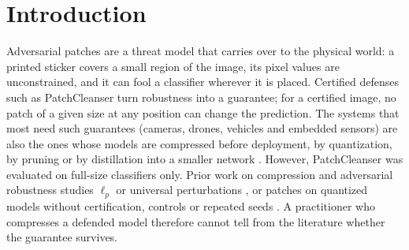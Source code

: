 \documentclass[10pt]{article}
\begin{document}
\section{Introduction}
\label{sec:intro}

Adversarial patches \citep{brown2017adversarial,karmon2018lavan} are a threat model that carries over to the physical
world: a printed sticker covers a small region of the image, its pixel values are unconstrained, and it can fool a
classifier wherever it is placed. Certified defenses such as PatchCleanser \citep{xiang2022patchcleanser} turn robustness
into a guarantee; for a certified image, no patch of a given size at any position can change the prediction. The systems
that most need such guarantees (cameras, drones, vehicles and embedded sensors) are also the ones whose models are
compressed before deployment, by quantization, by pruning or by distillation into a smaller network
\citep{han2016deep,jacob2018quantization,hinton2015distilling}. However, PatchCleanser was evaluated on full-size classifiers
only. Prior work on compression and adversarial robustness studies $\ell_p$ or universal perturbations
\citep{ye2019adversarial,sehwag2020hydra,matachana2021robustness}, or patches on quantized models without certification,
controls or repeated seeds \citep{guesmi2024exploring}. A practitioner who compresses a defended model therefore cannot
tell from the literature whether the guarantee survives.
\end{document}
